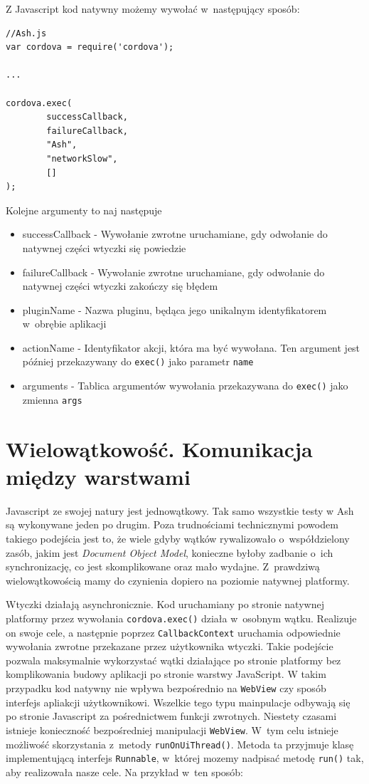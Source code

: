 \documentclass[brudnopis]{xmgr}
\begin{document}
Z Javascript kod natywny możemy wywołać w~następujący sposób:

\begin{lstlisting}
//Ash.js
var cordova = require('cordova');

...

cordova.exec( 
        successCallback,
        failureCallback, 
        "Ash", 
        "networkSlow", 
        []
);
\end{lstlisting}

Kolejne argumenty to naj następuje
\begin{itemize}
  \item successCallback - Wywołanie zwrotne uruchamiane, gdy odwołanie do natywnej części wtyczki się powiedzie
  \item failureCallback - Wywołanie zwrotne uruchamiane, gdy odwołanie do natywnej części wtyczki zakończy się błędem
  \item pluginName - Nazwa pluginu, będąca jego unikalnym identyfikatorem w~obrębie aplikacji
  \item actionName - Identyfikator akcji, która ma być wywołana. Ten argument jest później przekazywany do \texttt{exec()} jako parametr \texttt{name} 
\item arguments - Tablica argumentów wywołania przekazywana do \texttt{exec()} jako zmienna \texttt{args} 
\end{itemize}

\section{Wielowątkowość. Komunikacja między warstwami}

Javascript ze swojej natury jest jednowątkowy. Tak samo wszystkie testy w Ash są wykonywane jeden po drugim. Poza trudnościami technicznymi powodem takiego podejścia jest to, że wiele gdyby wątków rywalizowało o~współdzielony zasób, jakim jest \textit{Document Object Model}, konieczne byłoby zadbanie o~ich synchronizację, co jest skomplikowane oraz mało wydajne. Z~prawdziwą wielowątkowością mamy do czynienia dopiero na poziomie natywnej platformy.

Wtyczki działają asynchronicznie. Kod uruchamiany po stronie natywnej platformy przez wywołania \texttt{cordova.exec()} działa w~osobnym wątku. Realizuje on swoje cele, a następnie poprzez \texttt{CallbackContext} uruchamia odpowiednie wywołania zwrotne przekazane przez użytkownika wtyczki. Takie podejście pozwala maksymalnie wykorzystać wątki działające po stronie platformy bez komplikowania budowy aplikacji po stronie warstwy JavaScript. W takim przypadku kod natywny nie wpływa bezpośrednio na \texttt{WebView} czy sposób interfejs apliakcji użytkownikowi. Wszelkie tego typu mainpulacje odbywają się po stronie Javascript za pośrednictwem funkcji zwrotnych. Niestety czasami istnieje konieczność bezpośredniej manipulacji \texttt{WebView}. W~tym celu istnieje możliwość skorzystania z~metody \texttt{runOnUiThread()}. Metoda ta przyjmuje klasę implementującą interfejs \texttt{Runnable}, w~której mozemy nadpisać metodę \texttt{run()} tak, aby realizowała nasze cele. Na przykład w~ten sposób:
\end{document}
